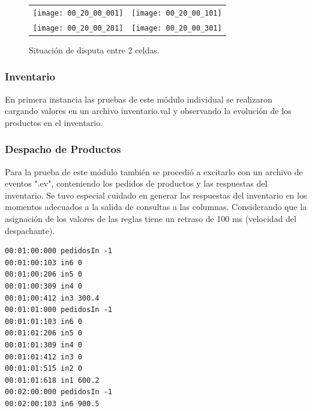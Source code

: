 \documentclass[10pt]{article}
\begin{document}
 \begin{figure}[h] 
 \centering
 
 	\begin{tabular}{cc}
 		\texttt{[image: 00\_20\_00\_001]} &
 		\texttt{[image: 00\_20\_00\_101]} \\[5mm]
 		\texttt{[image: 00\_20\_00\_201]} &
 		\texttt{[image: 00\_20\_00\_301]} \\
 	\end{tabular}
 	
 	\caption{Situación de disputa entre 2 celdas.} 
 	\label{fig:IP-ensayodisputa} 
 \end{figure}
 \FloatBarrier

\subsubsection{Inventario}
En primera instancia las pruebas de este módulo individual se realizaron cargando valores en un archivo inventario.val y observando la evolución de los productos en el inventario.
\subsubsection{Despacho de Productos}
Para la prueba de este módulo también se procedió a excitarlo con un archivo de eventos ".ev", conteniendo los pedidos de productos y las respuestas del inventario. Se tuvo especial cuidado en generar las respuestas del inventario en los momentos adecuados a la salida de consultas a las columnas. Considerando que la asignación de los valores de las reglas tiene un retraso de 100 ms (velocidad del despachante).

\begin{minipage}{1\textwidth}
	\centering
	\begin{lstlisting}
00:01:00:000 pedidosIn -1
00:01:00:103 in6 0
00:01:00:206 in5 0
00:01:00:309 in4 0
00:01:00:412 in3 300.4
00:01:01:000 pedidosIn -1
00:01:01:103 in6 0
00:01:01:206 in5 0
00:01:01:309 in4 0
00:01:01:412 in3 0
00:01:01:515 in2 0
00:01:01:618 in1 600.2
00:02:00:000 pedidosIn -1
00:02:00:103 in6 900.5
	\end{lstlisting}	
\end{minipage}
\end{document}
